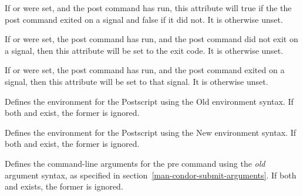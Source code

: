 \begin{description}
\item[\AdAttr{PostCmdExitBySignal}:] If  or
 were set, and the post command has run,
this attribute will true if the the post command exited on a signal and
false if it did not.  It is otherwise unset.

\item[\AdAttr{PostCmdExitCode}:] If  or
 were set, the post command has run,
and the post command did not exit on a signal, then this attribute will
be set to the exit code.  It is otherwise unset.

\item[\AdAttr{PostCmdExitSignal}:] If  or
 were set, the post command has run,
and the post command exited on a signal, then this attribute will
be set to that signal.  It is otherwise unset.

\item[\AdAttr{PostEnv}:] Defines the environment for the Postscript
using the Old environment syntax. If both  and
 exist, the former is ignored.

\item[\AdAttr{PostEnvironment}:] Defines the environment for the Postscript
using the New environment syntax. If both  and
 exist, the former is ignored.

\item[\AdAttr{PreArgs}:] Defines the command-line arguments for the
pre command using the \emph{old} argument syntax, as specified in
section~\ref{man-condor-submit-arguments}.  If both 
and  exists, the former is ignored.


\end{description}
